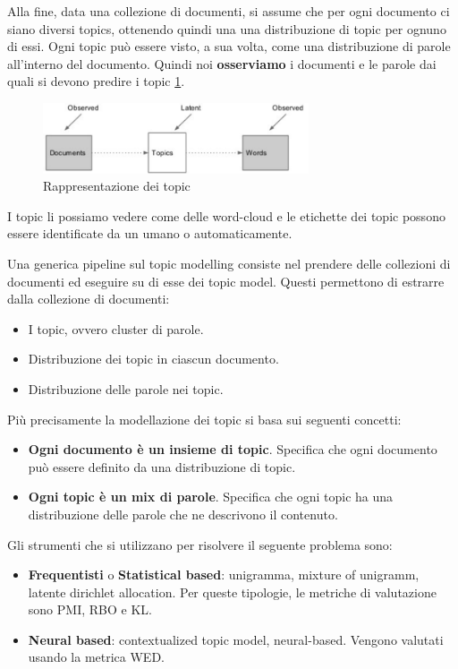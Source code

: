 Alla fine, data una collezione di documenti, si assume che per ogni documento ci
siano diversi topics, ottenendo quindi una una distribuzione di topic per ognuno
di essi. Ogni topic può essere visto, a sua volta, come una distribuzione di parole
all'interno del documento. Quindi noi \textbf{osserviamo} i documenti e le parole
dai quali si devono predire i topic \ref{fig:topic}.
\begin{figure}[!ht]
      \centering
      \includegraphics[width=0.7\textwidth]{img/nlp/topic_model.png}
      \caption{Rappresentazione dei topic}
      \label{fig:topic}
\end{figure}
\begin{nota}
      I topic li possiamo vedere come delle word-cloud e le etichette dei topic
      possono essere identificate da un umano o automaticamente.
\end{nota}
Una generica pipeline sul topic modelling consiste nel prendere delle collezioni
di documenti ed eseguire su di esse dei topic model. Questi permettono di
estrarre dalla collezione di documenti:
\begin{itemize}
      \item I topic, ovvero cluster di parole.
      \item Distribuzione dei topic in ciascun documento.
      \item Distribuzione delle parole nei topic.
\end{itemize}

Più precisamente la modellazione dei topic si basa sui seguenti concetti:
\begin{itemize}
      \item \textbf{Ogni documento è un insieme di topic}. Specifica che ogni
            documento può essere definito da una distribuzione di topic.
      \item \textbf{Ogni topic è un mix di parole}. Specifica che ogni topic ha
            una distribuzione delle parole che ne descrivono il contenuto.
\end{itemize}
Gli strumenti che si utilizzano per risolvere il seguente problema sono:
\begin{itemize}
      \item \textbf{Frequentisti} o \textbf{Statistical based}: unigramma, mixture
            of unigramm, latente dirichlet allocation. Per queste tipologie, le
            metriche di valutazione sono PMI, RBO e KL.
      \item \textbf{Neural based}: contextualized topic model, neural-based. Vengono
            valutati usando la metrica WED.
\end{itemize}

